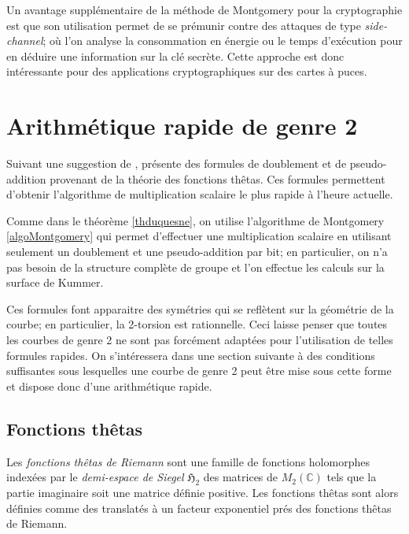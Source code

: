 \documentclass[a4paper,12pt]{article}
\theoremstyle{definition}
\theoremstyle{remark}
\numberwithin{equation}{section}
\begin{document}
Un avantage supplémentaire de la méthode de Montgomery pour la cryptographie est que son utilisation permet de se prémunir contre des attaques de type \emph{side-channel}; où l'on analyse la consommation en énergie ou le temps d'exécution pour en déduire une information sur la clé secrète. Cette approche est donc intéressante pour des applications cryptographiques sur des cartes à puces.

\section{Arithmétique rapide de genre 2}

Suivant une suggestion de \cite{chudnovsky}, \citep{gaudry} présente des formules de doublement et de pseudo-addition provenant de la théorie des fonctions thêtas. Ces formules permettent d'obtenir l'algorithme de multiplication scalaire le plus rapide à l'heure actuelle.

Comme dans le théorème \ref{thduquesne}, on utilise l'algorithme de Montgomery \ref{algoMontgomery} qui permet d'effectuer une multiplication scalaire en utilisant seulement un doublement et une pseudo-addition par bit; en particulier, on n'a pas besoin de la structure complète de groupe et l'on effectue les calculs sur la surface de Kummer.

Ces formules font apparaitre des symétries qui se reflètent sur la géométrie de la courbe; en particulier, la 2-torsion est rationnelle. Ceci laisse penser que toutes les courbes de genre 2 ne sont pas forcément adaptées pour l'utilisation de telles formules rapides. On s'intéressera dans une section suivante à des conditions suffisantes sous lesquelles une courbe de genre 2 peut être mise sous cette forme et dispose donc d'une arithmétique rapide. 

\subsection{Fonctions thêtas}
Les \emph{fonctions thêtas de Riemann} sont une famille de fonctions holomorphes indexées par le \emph{demi-espace de Siegel} $\mathfrak{H}_2$ des matrices de $M_2(\mathbb{C})$ tels que la partie imaginaire soit une matrice définie positive. Les fonctions thêtas sont alors définies comme des translatés à un facteur exponentiel prés des fonctions thêtas de Riemann.
\end{document}
